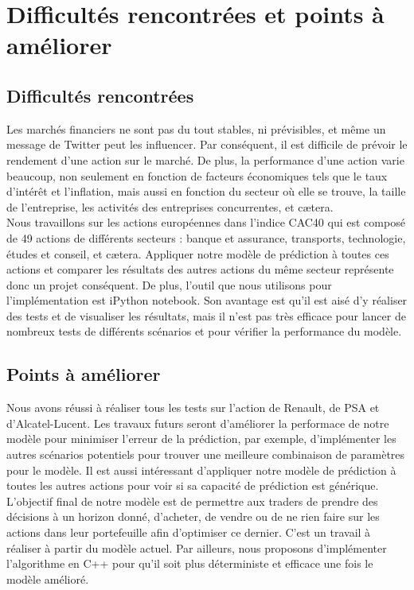 \section{Difficultés rencontrées et points à améliorer}

\subsection{Difficultés rencontrées}
Les marchés financiers ne sont pas du tout stables, ni prévisibles, et même un message de Twitter peut les influencer. Par conséquent, il est difficile de prévoir le rendement d'une action sur le marché. De plus, la performance d'une action varie beaucoup, non seulement en fonction de facteurs économiques tels que le taux d'intérêt et l'inflation, mais aussi en fonction du secteur où elle se trouve, la taille de l'entreprise, les activités des entreprises concurrentes, et cætera.\\

Nous travaillons sur les actions européennes dans l'indice CAC40 qui est composé de 49 actions de différents secteurs : banque et assurance, transports, technologie, études et conseil, et cætera. Appliquer notre modèle de prédiction à toutes ces actions et comparer les résultats des autres actions du même secteur représente donc un projet conséquent. De plus, l'outil que nous utilisons pour l'implémentation est iPython notebook. Son avantage est qu'il est aisé d'y réaliser des tests et de visualiser les résultats, mais il n'est pas très efficace pour lancer de nombreux tests de différents scénarios et pour vérifier la performance du modèle.\\

\subsection{Points à améliorer}
Nous avons réussi à réaliser tous les tests sur l'action de Renault, de PSA et d'Alcatel-Lucent. Les travaux futurs seront d'améliorer la performace de notre modèle pour minimiser l'erreur de la prédiction, par exemple, d'implémenter les autres scénarios potentiels pour trouver une meilleure combinaison de paramètres pour le modèle. Il est aussi intéressant d'appliquer notre modèle de prédiction à toutes les autres actions pour voir si sa capacité de prédiction est générique.\\

L'objectif final de notre modèle est de permettre aux traders de prendre des décisions à un horizon donné, d'acheter, de vendre ou de ne rien faire sur les actions dans leur portefeuille afin d'optimiser ce dernier. C'est un travail à réaliser à partir du modèle actuel. Par ailleurs, nous proposons d'implémenter l'algorithme en C++ pour qu'il soit plus déterministe et efficace une fois le modèle amélioré.
